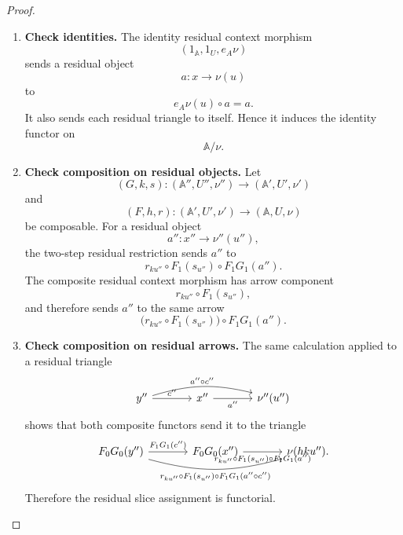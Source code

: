 \begin{proof}
    \leavevmode
    \begin{enumerate}
        \item \textbf{Check identities.}
        The identity residual context morphism
        \[
            (1_{\mathbb A},1_U,e_A\nu)
        \]
        sends a residual object
        \[
            a:x\to\nu(u)
        \]
        to
        \[
            e_A\nu(u)\circ a=a.
        \]
        It also sends each residual triangle to itself. Hence it induces the
        identity functor on
        \[
            \mathbb A/\nu.
        \]

        \item \textbf{Check composition on residual objects.}
        Let
        \[
            (G,k,s):
            (\mathbb A'',U'',\nu'')
            \to
            (\mathbb A',U',\nu')
        \]
        and
        \[
            (F,h,r):
            (\mathbb A',U',\nu')
            \to
            (\mathbb A,U,\nu)
        \]
        be composable. For a residual object
        \[
            a'':x''\to\nu''(u''),
        \]
        the two-step residual restriction sends \(a''\) to
        \[
            r_{k u''}\circ F_1(s_{u''})\circ F_1G_1(a'').
        \]
        The composite residual context morphism has arrow component
        \[
            r_{k u''}\circ F_1(s_{u''}),
        \]
        and therefore sends \(a''\) to the same arrow
        \[
            \bigl(r_{k u''}\circ F_1(s_{u''})\bigr)
            \circ F_1G_1(a'').
        \]

        \item \textbf{Check composition on residual arrows.}
        The same calculation applied to a residual triangle
        \[
        \begin{tikzcd}[column sep=large, row sep=large]
            y''
                \arrow[r, "c''"]
                \arrow[rr, "a''\circ c''", bend left=15]
            &
            x''
                \arrow[r, "a''"']
            &
            \nu''(u'')
        \end{tikzcd}
        \]
        shows that both composite functors send it to the triangle
        \[
        \begin{tikzcd}[column sep=large, row sep=large]
            F_0G_0(y'')
                \arrow[r, "{F_1G_1(c'')}"]
                \arrow[rr,
                    "{r_{k u''}\circ F_1(s_{u''})\circ F_1G_1(a''\circ c'')}"',
                    bend right=15]
            &
            F_0G_0(x'')
                \arrow[r,
                    "{r_{k u''}\circ F_1(s_{u''})\circ F_1G_1(a'')}"']
            &
            \nu(hk u'').
        \end{tikzcd}
        \]
        Therefore the residual slice assignment is functorial.
    \end{enumerate}
\end{proof}

